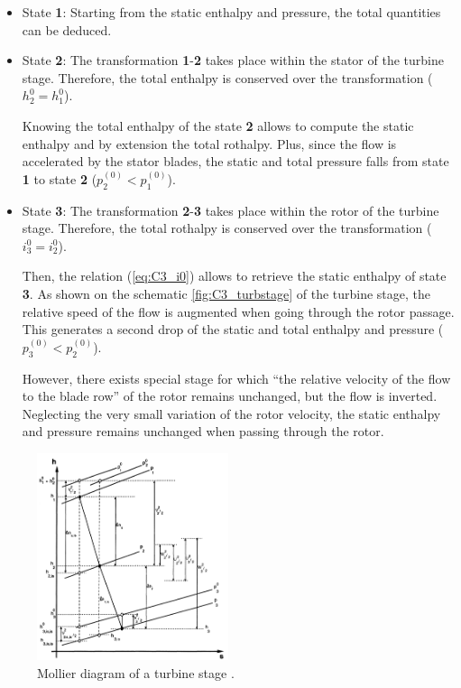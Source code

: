 \begin{itemize}
    \item State \textbf{1}: Starting from the static enthalpy and pressure, the total quantities can be deduced.
    \item State \textbf{2}: The transformation \textbf{1}-\textbf{2} takes place within the stator of the turbine stage. Therefore, the total enthalpy is conserved over the transformation ($h_2^0=h_1^0$).

          Knowing the total enthalpy of the state \textbf{2} allows to compute the static enthalpy and by extension the total rothalpy. Plus, since the flow is accelerated by the stator blades, the static and total pressure falls from state \textbf{1} to state \textbf{2} (\(p_2^{(0)}<p_1^{(0)}\)).
    \item State \textbf{3}: The transformation \textbf{2}-\textbf{3} takes place within the rotor of the turbine stage. Therefore, the total rothalpy is conserved over the transformation (\(i_3^0=i_2^0\)).

          Then, the relation (\ref{eq:C3_i0}) allows to retrieve the static enthalpy of state \textbf{3}. As shown on the schematic \ref{fig:C3_turbstage} of the turbine stage, the relative speed of the flow is augmented when going through the rotor passage. This generates a second drop of the static and total enthalpy and pressure (\(p_3^{(0)}<p_2^{(0)}\)).

          However, there exists special stage for which “the relative velocity of the flow to the blade row” of the rotor\cite{Hillewaert2019} remains unchanged, but the flow is inverted. Neglecting the very small variation of the rotor velocity, the static enthalpy and pressure remains unchanged when passing through the rotor.
\end{itemize}

\begin{figure}[h]
    \centering
    \includegraphics[width=0.5\textwidth]{Turb_mollier.png}
    \caption{Mollier diagram of a turbine stage \cite{Hillewaert2019}.}
    \label{fig:C3_Mollierturb}
\end{figure}


